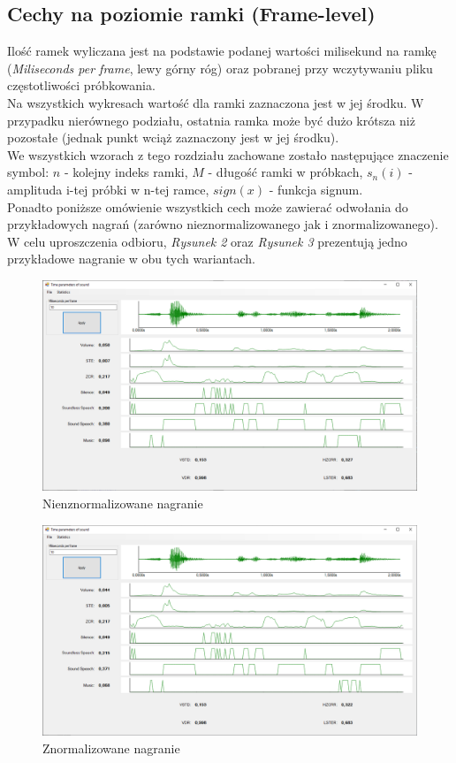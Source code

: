 \documentclass[a4paper]{article}
\begin{document}
\subsection{Cechy na poziomie ramki (Frame-level)}
Ilość ramek wyliczana jest na podstawie podanej wartości milisekund na ramkę (\textit{Miliseconds per frame}, lewy górny róg) oraz pobranej przy wczytywaniu pliku częstotliwości próbkowania.\\
Na wszystkich wykresach wartość dla ramki zaznaczona jest w jej środku. W przypadku nierównego podziału, ostatnia ramka może być dużo krótsza niż pozostałe (jednak punkt wciąż zaznaczony jest w jej środku).\\
We wszystkich wzorach z tego rozdziału zachowane zostało następujące znaczenie symbol: \textit{$n$} - kolejny indeks ramki, \textit{$M$} - długość ramki w próbkach, \textit{$s_n(i)$} - amplituda i-tej próbki w n-tej ramce, \textit{$sign(x)$} - funkcja signum.\\
Ponadto poniższe omówienie wszystkich cech może zawierać odwołania do przykładowych nagrań (zarówno nieznormalizowanego jak i znormalizowanego). W celu uproszczenia odbioru, \textit{Rysunek 2} oraz \textit{Rysunek 3} prezentują jedno przykładowe nagranie w obu tych wariantach.
\begin{figure}[H]
  \includegraphics[width=\linewidth]{images/02notnormalized.png}
  \caption{Nienznormalizowane nagranie}
\end{figure}
\begin{figure}[H]
  \includegraphics[width=\linewidth]{images/03normalized.png}
  \caption{Znormalizowane nagranie}
\end{figure}
\end{document}
